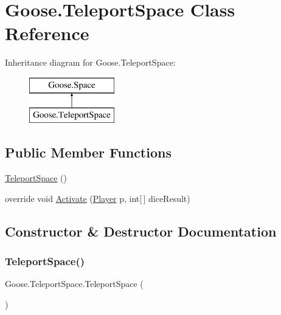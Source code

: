 \hypertarget{class_goose_1_1_teleport_space}{}\section{Goose.\+Teleport\+Space Class Reference}
\label{class_goose_1_1_teleport_space}
Inheritance diagram for Goose.\+Teleport\+Space\+:\begin{figure}[H]
\begin{center}
\leavevmode
\includegraphics[height=2.000000cm]{class_goose_1_1_teleport_space}
\end{center}
\end{figure}
\subsection*{Public Member Functions}
\begin{DoxyCompactItemize}
\item 
\hyperlink{class_goose_1_1_teleport_space_a6157dd66ff2d3cd4b24d75f95c7df6b8}{Teleport\+Space} ()
\item 
override void \hyperlink{class_goose_1_1_teleport_space_ac85e087a0a946881741b947588a60a8c}{Activate} (\hyperlink{class_goose_1_1_player}{Player} p, int\mbox{[}$\,$\mbox{]} dice\+Result)
\end{DoxyCompactItemize}


\subsection{Constructor \& Destructor Documentation}
\mbox{\label{class_goose_1_1_teleport_space_a6157dd66ff2d3cd4b24d75f95c7df6b8}} 
\subsubsection{\texorpdfstring{Teleport\+Space()}{TeleportSpace()}}
{\footnotesize\ttfamily Goose.\+Teleport\+Space.\+Teleport\+Space (\begin{DoxyParamCaption}{ }\end{DoxyParamCaption})}



